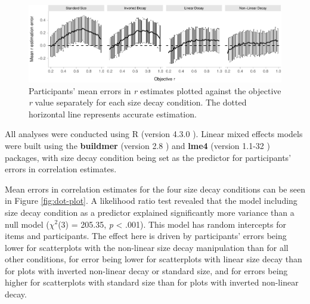 \documentclass{vgtc}                          %
\begin{document}
\begin{table}

\caption{\label{tab:contrasts-table}Contrasts between the four levels of the size decay condition.}
\centering
{}
\end{table}

\begin{figure}
\includegraphics[width=1\linewidth]{size_and_scatterplots_files/figure-latex/changes-with-r-size-1} \caption{Participants' mean errors in \textit{r} estimates plotted against the objective \textit{r} value separately for each size decay condition. The dotted horizontal line represents accurate estimation.}\label{fig:changes-with-r-size}
\end{figure}

All analyses were conducted using R (version 4.3.0 \cite{r_core}). Linear mixed effects models were
built using the \textbf{buildmer} (version 2.8 \cite{voeten_buildmer}) and \textbf{lme4}
(version 1.1-32 \cite{bates_lme4_2015}) packages, with size decay condition being set
as the predictor for participants' errors in correlation estimates.

Mean errors in correlation estimates for the four size decay conditions
can be seen in Figure \ref{fig:dot-plot}. A likelihood ratio test revealed that the
model including size decay condition as a predictor explained significantly more
variance than a null model (\(\chi^2\)(3) = 205.35,
\emph{p} \textless{} .001). This model has random intercepts for
items and participants. The effect here is driven by participants' errors being lower
for scatterplots with the non-linear size decay manipulation than for all other conditions,
for error being lower for scatterplots with linear size decay than for plots with
inverted non-linear decay or standard size, and for errors being higher for scatterplots
with standard size than for plots with inverted non-linear decay.
\end{document}
